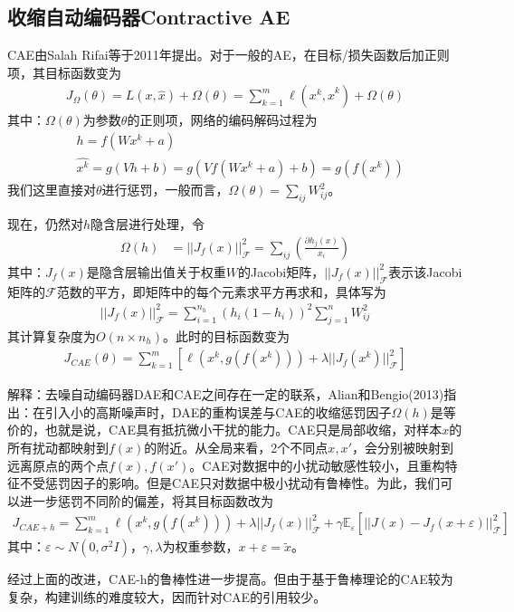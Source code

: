     \subsection{收缩自动编码器Contractive AE}
        \par
        CAE\cite{2011.Salah}由Salah Rifai等于2011年提出。对于一般的AE，在目标/损失函数后加正则项，其目标函数变为
        \begin{align*}
        J_\Omega(\theta) = L(x,\hat{x})+\Omega(\theta)  = \sum_{k=1}^m\ell(x^k,\hat{x}^k)+\Omega(\theta)
        \end{align*}
        其中：$\Omega(\theta)$为参数$\theta$的正则项，网络的编码解码过程为
        \begin{align*}
        & h=f(Wx^k+a)\\
        & \hat{x^k} = g(Vh+b) = g(Vf(Wx^k+a)+b) = g(f(x^k))
        \end{align*}
        我们这里直接对$\theta$进行惩罚，一般而言，$\Omega(\theta) = \sum_{ij}W_{ij}^2$。
        \par
        现在，仍然对$h$隐含层进行处理，令
        \begin{align*}
        \Omega(h) & = ||J_f(x)||_{\mathcal{F}}^2 =\sum_{ij} \left( \frac{\partial h_j(x)}{x_i} \right)
        \end{align*}
        其中：$J_f(x)$是隐含层输出值关于权重$W$的Jacobi矩阵，$||J_f(x)||_{\mathcal{F}}^2$表示该Jacobi矩阵的$\mathcal{F}$范数的平方，即矩阵中的每个元素求平方再求和，具体写为
        \begin{align*}
        ||J_f(x)||_{\mathcal{F}}^2 = \sum_{i=1}^{n_h} (h_i(1-h_i))^2 \sum_{j=1}^nW_{ij}^2
        \end{align*}
        其计算复杂度为$O(n\times n_h)$。此时的目标函数变为
        \begin{align*}
        J_{CAE}(\theta) = \sum_{k=1}^m \left[ \ell \left( x^k,g(f(x^k)) \right)  + \lambda ||J_f(x^k)||_{\mathcal{F}}^2 \right]
        \end{align*}
        \par
        解释：去噪自动编码器DAE和CAE之间存在一定的联系，Alian和Bengio(2013)指出：在引入小的高斯噪声时，DAE的重构误差与CAE的收缩惩罚因子$\Omega (h)$是等价的，也就是说，CAE具有抵抗微小干扰的能力。CAE只是局部收缩，对样本$x$的所有扰动都映射到$f(x)$的附近。从全局来看，2个不同点$x,x'$，会分别被映射到远离原点的两个点$f(x),f(x')$。CAE对数据中的小扰动敏感性较小，且重构特征不受惩罚因子的影响。但是CAE只对数据中极小扰动有鲁棒性。为此，我们可以进一步惩罚不同阶的偏差，将其目标函数改为
        \begin{align*}
        J_{CAE+h} = \sum_{k=1}^m \ell \left( x^k,g(f(x^k)) \right) + \lambda ||J_f(x)||_{\mathcal{F}}^2+ \gamma \mathbb{E}_\varepsilon [ ||J(x) - J_f(x+\varepsilon)||_{\mathcal{F}}^2  ]
        \end{align*}
        其中：$\varepsilon \sim N(0,\sigma^2 I)$，$\gamma,\lambda$为权重参数，$x+\varepsilon = \tilde{x}$。
        \par
        经过上面的改进，CAE-h的鲁棒性进一步提高。但由于基于鲁棒理论的CAE较为复杂，构建训练的难度较大，因而针对CAE的引用较少。
